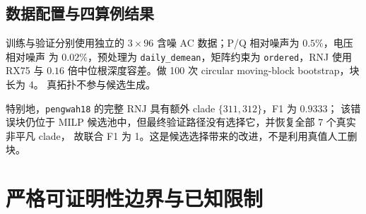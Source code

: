 \documentclass[UTF8,11pt]{ctexart}
\begin{document}
\subsection{数据配置与四算例结果}

训练与验证分别使用独立的 $3\times96$ 含噪 AC 数据；P/Q 相对噪声为 $0.5\%$，电压相对噪声
为 $0.02\%$，预处理为 \texttt{daily\_demean}，矩阵约束为 \texttt{ordered}，RNJ 使用
RX75 与 $0.16$ 倍中位根深度容差。做 100 次 circular moving-block bootstrap，块长为 4。
真拓扑不参与候选生成。


\FloatBarrier
特别地，\texttt{pengwah18} 的完整 RNJ 具有额外 clade $\{311,312\}$，F1 为 $0.9333$；
该错误块仍位于 MILP 候选池中，但最终验证路径没有选择它，并恢复全部 7 个真实非平凡 clade，
故联合 F1 为 1。这是候选选择带来的改进，不是利用真值人工删块。

\section{严格可证明性边界与已知限制}
\end{document}
